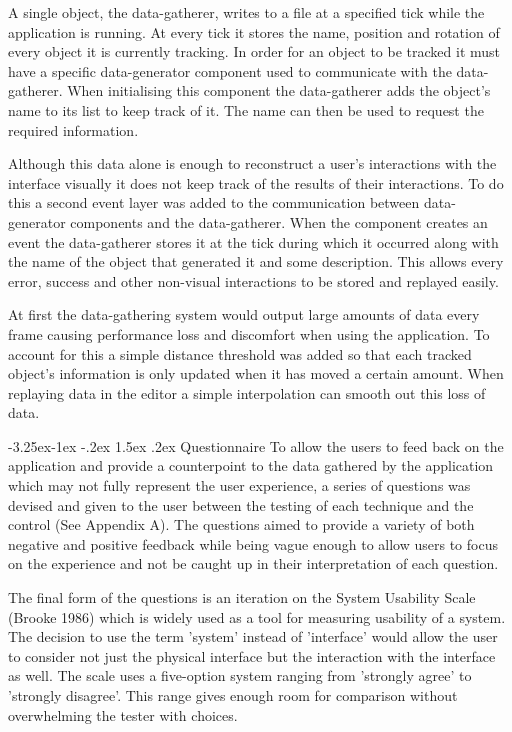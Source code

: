 \documentclass[12pt]{article}
\makeatletter
\renewcommand{\subsubsection}{\@startsection{subsubsection}{2}{\z@}%
             {-3.25ex\@plus -1ex \@minus -.2ex}%
             {1.5ex \@plus .2ex}%
             {\normalfont\normalsize\scshape\bfseries}}
\makeatother
\begin{document}
A single object, the data-gatherer, writes to a file at a specified tick while the application is running. At every tick it stores the name, position and rotation of every object it is currently tracking. In order for an object to be tracked it must have a specific data-generator component used to communicate with the data-gatherer. When initialising this component the data-gatherer adds the object's name to its list to keep track of it. The name can then be used to request the required information.

Although this data alone is enough to reconstruct a user's interactions with the interface visually it does not keep track of the results of their interactions. To do this a second event layer was added to the communication between data-generator components and the data-gatherer. When the component creates an event the data-gatherer stores it at the tick during which it occurred along with the name of the object that generated it and some description. This allows every error, success and other non-visual interactions to be stored and replayed easily.

At first the data-gathering system would output large amounts of data every frame causing performance loss and discomfort when using the application. To account for this a simple distance threshold was added so that each tracked object's information is only updated when it has moved a certain amount. When replaying data in the editor a simple interpolation can smooth out this loss of data.

\subsubsection{Questionnaire}
To allow the users to feed back on the application and provide a counterpoint to the data gathered by the application which may not fully represent the user experience, a series of questions was devised and given to the user between the testing of each technique and the control (See Appendix A). The questions aimed to provide a variety of both negative and positive feedback while being vague enough to allow users to focus on the experience and not be caught up in their interpretation of each question.

The final form of the questions is an iteration on the System Usability Scale (Brooke 1986) which is widely used as a tool for measuring usability of a system. The decision to use the term 'system' instead of 'interface' would allow the user to consider not just the physical interface but the interaction with the interface as well. The scale uses a five-option system ranging from 'strongly agree' to 'strongly disagree'. This range gives enough room for comparison without overwhelming the tester with choices. 
\end{document}
